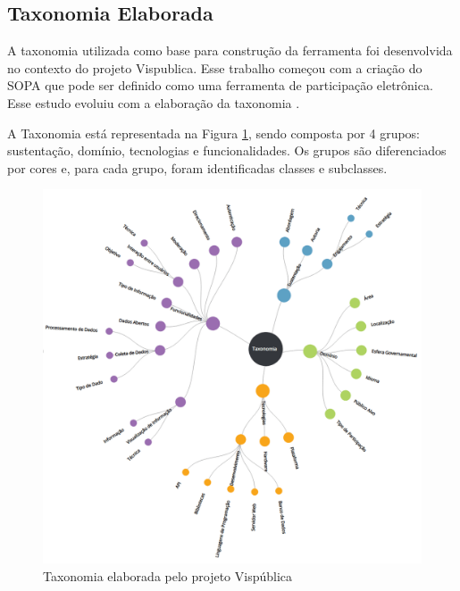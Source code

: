 \subsection{Taxonomia Elaborada}
\label{subsec:taxonomiaElaborada}
\par
A taxonomia utilizada como base para construção da ferramenta foi desenvolvida no contexto do projeto Vispublica. Esse trabalho começou com a criação do SOPA que pode ser definido como uma 
ferramenta de participação eletrônica. Esse estudo evoluiu com a elaboração da taxonomia . 

\par
A Taxonomia está representada na Figura \ref{fig:taxonomia-vispublica}, sendo composta por 4 grupos: sustentação, domínio, tecnologias e funcionalidades.
Os grupos são diferenciados por cores e, para cada grupo, foram identificadas classes e subclasses.

\begin{figure}[!ht]
    \centering
    \includegraphics[scale=0.30]{./figuras/taxonopart-radial.png}
    \caption{Taxonomia elaborada pelo projeto Vispública}
    \label{fig:taxonomia-vispublica}
\end{figure}

